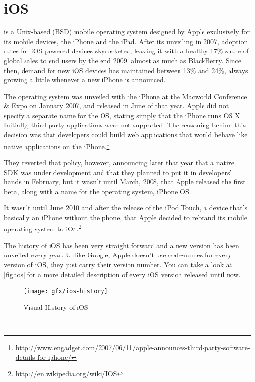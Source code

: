 \section{iOS}
 is a Unix-based (BSD) mobile operating system designed by Apple exclusively for its mobile devices, the iPhone and the iPad. After its unveiling in 2007, adoption rates for iOS powered devices skyrocketed, leaving it with a healthy 17\% share of global sales to end users by the end 2009, almost as much as BlackBerry. Since then, demand for new iOS devices has maintained between 13\% and 24\%, always growing a little whenever a new iPhone is announced.

The operating system was unveiled with the iPhone at the Macworld Conference \& Expo on January 2007, and released in June of that year. Apple did not specify a separate name for the \ac{OS}, stating simply that the iPhone runs OS X. Initially, third-party applications were not supported. The reasoning behind this decision was that developers could build web applications that would behave like native applications on the iPhone.\footnote{\url{http://www.engadget.com/2007/06/11/apple-announces-third-party-software-details-for-iphone/}} 

They reverted that policy, however, announcing later that year that a native \ac{SDK} was under development and that they planned to put it in developers' hands in February, but it wasn't until March, 2008, that Apple released the first beta, along with a name for the operating system, iPhone \ac{OS}.

It wasn't until June 2010 and after the release of the iPod Touch, a device that's basically an iPhone without the phone, that Apple decided to rebrand its mobile operating system to iOS.\footnote{\url{http://en.wikipedia.org/wiki/IOS}}

The history of iOS has been very straight forward and a new version has been unveiled every year. Unlike Google, Apple doesn't use code-names for every version of iOS, they just carry their version number. You can take a look at \autoref{fig:ios} for a more detailed description of every iOS version released until now.  

\begin{figure}[H]
    \begin{center}
        {\texttt{[image: gfx/ios-history]}}
        \caption[Visual History of iOS]{Visual History of iOS\footnotemark}\label{fig:ios}
    \end{center}
\end{figure}
\\

